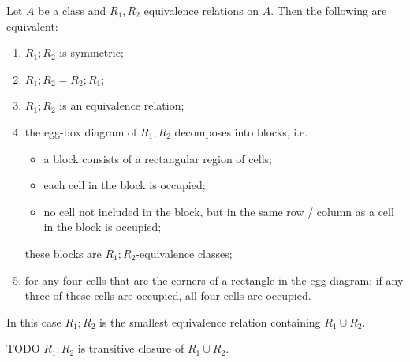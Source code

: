\begin{proposition} \label{commutingEquivalenceRelations}
Let $A$ be a class and $R_1, R_2$ equivalence relations on $A$. Then the following are equivalent:
\begin{enumerate}
\item $R_1;R_2$ is symmetric;
\item $R_1;R_2 = R_2;R_1$;
\item $R_1;R_2$ is an equivalence relation;
\item the egg-box diagram of $R_1, R_2$ decomposes into blocks, i.e.\
\begin{itemize}
\item a block consists of a rectangular region of cells;
\item each cell in the block is occupied;
\item no cell not included in the block, but in the same row / column as a cell in the block is occupied;
\end{itemize}
these blocks are $R_1;R_2$-equivalence classes;
\item for any four cells that are the corners of a rectangle in the egg-diagram: if any three of these cells are occupied, all four cells are occupied.
\end{enumerate}
In this case $R_1;R_2$ is the smallest equivalence relation containing $R_1\cup R_2$.
\end{proposition}
TODO $R_1; R_2$ is transitive closure of $R_1\cup R_2$.
